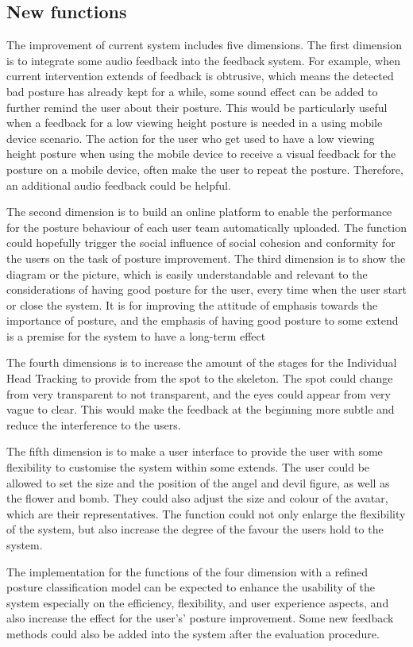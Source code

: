 \subsection{New functions}
The improvement of current system includes five dimensions. The first dimension is to integrate some audio feedback into the feedback system. For example, when current intervention extends of feedback is obtrusive, which means the detected bad posture has already kept for a while, some sound effect can be added to further remind the user about their posture. This would be particularly useful when a feedback for a low viewing height posture is needed in a using mobile device scenario. The action for the user who get used to have a low viewing height posture when using the mobile device to receive a visual feedback for the posture on a mobile device, often make the user to repeat the posture. Therefore, an additional audio feedback could be helpful.

The second dimension is to build an online platform to enable the performance for the posture behaviour of each user team automatically uploaded. The function could hopefully trigger the social influence of social cohesion and conformity for the users on the task of posture improvement. The third dimension is to show the diagram or the picture, which is easily understandable and relevant to the considerations of having good posture for the user, every time when the user start or close the system. It is for improving the attitude of emphasis towards the importance of posture, and the emphasis of having good posture to some extend is a premise for the system to have a long-term effect

The fourth dimensions is to increase the amount of the stages for the Individual Head Tracking to provide from the spot to the skeleton. The spot could change from very transparent to not transparent, and the eyes could appear from very vague to clear. This would make the feedback at the beginning more subtle and reduce the interference to the users.

The fifth dimension is to make a user interface to provide the user with some flexibility to customise the system within some extends. The user could be allowed to set the size and the position of the angel and devil figure, as well as the flower and bomb. They could also adjust the size and colour of the avatar, which are their representatives. The function could not only enlarge the flexibility of the system, but also increase the degree of the favour the users hold to the system.

The implementation for the functions of the four dimension with a refined posture classification model can be expected to enhance the usability of the system especially on the efficiency, flexibility, and user experience aspects, and also increase the effect for the user's' posture improvement. Some new feedback methods could also be added into the system after the evaluation procedure.
